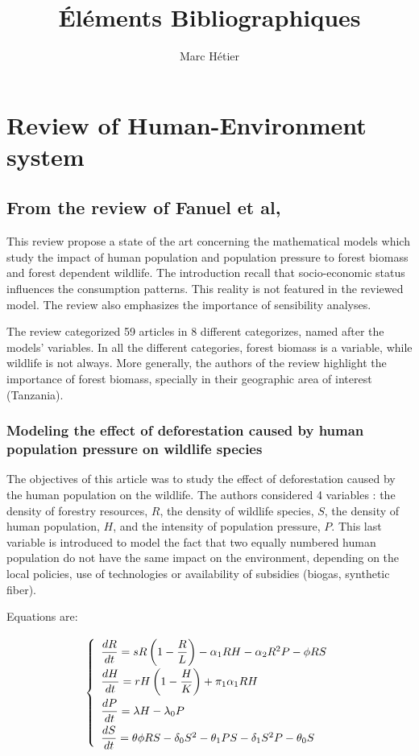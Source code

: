 \documentclass{article}
\title{Éléments Bibliographiques}
\author{Marc Hétier}
\begin{document}
\maketitle


\section{Review of Human-Environment system}

\subsection{From the review of Fanuel et al, \cite{fanuel_modelling_2023}}

This review propose a state of the art concerning the mathematical models which study the impact of human population and population pressure to forest biomass and forest dependent wildlife. The introduction recall that socio-economic status influences the consumption patterns. This reality is not featured in the reviewed model. The review also emphasizes the importance of sensibility analyses.

The review categorized 59 articles in 8 different categorizes, named after the models' variables. In all the different categories, forest biomass is a variable, while wildlife is not always. More generally, the authors of the review highlight the importance of forest biomass, specially in their geographic area of interest (Tanzania).

\subsubsection{Modeling the effect of deforestation caused by human population pressure on wildlife species \cite{lata_modeling_2018}}

The objectives of this article was to study the effect of deforestation caused by the human population on the wildlife. The authors considered 4 variables : the density of forestry resources, $R$, the density of wildlife species, $S$, the density of human population, $H$, and the intensity of population pressure, $P$. This last variable is introduced to model the fact that two equally numbered human population do not have the same impact on the environment, depending on the local policies, use of technologies or availability of  subsidies (biogas, synthetic fiber). 

Equations are:

\begin{equation}
\def\arraystretch{2}
\left\lbrace \begin{array}{l}
\dfrac{dR}{dt} =  sR \left(1-\dfrac{R}{L}\right) - \alpha_1 RH - \alpha_2 R^2 P - \phi RS \\
\dfrac{dH}{dt} =  rH \left(1-\dfrac{H}{K}\right)  + \pi_1 \alpha_1 RH \\
\dfrac{dP}{dt} = \lambda H - \lambda_0 P \\
\dfrac{dS}{dt} = \theta \phi R S - \delta_0 S^2 - \theta_1 PS - \delta_1 S^2 P - \theta_0 S
\end{array} \right.
\end{equation}
\end{document}
